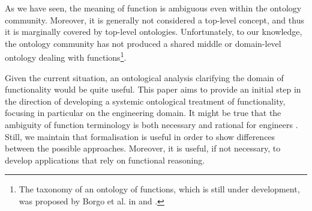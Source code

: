 \documentclass[sw]{iosart2x}
\newcommand{\TODO}[1]{{\color{red} #1
}}
\begin{document}


As we have seen, 
the meaning of function is ambiguous even within the ontology community. 
Moreover, it is generally not considered a top-level concept, and thus it is marginally covered by top-level ontologies. 
Unfortunately, to our knowledge, the ontology community has not produced a shared middle or domain-level ontology dealing with functions\footnote{The taxonomy of an ontology of functions, which is still under development, was proposed by Borgo et al. in \cite{borgoCapabilitiesCapacitiesFunctionalities2021} and \cite{borgoKnowledgebasedAdaptiveAgents2019}.}. 

Given the current situation, an ontological analysis clarifying the domain of functionality would be quite useful.
This paper aims to provide an initial step in the direction of developing a systemic ontological treatment of functionality, focusing in particular on the engineering domain.
It might be true that the ambiguity of function terminology is both necessary and rational for engineers \cite{vermaasConceptualElusivenessEngineering2012}. 
Still, we maintain that formalisation is useful in order to show differences between the possible approaches. Moreover, it is useful, if not necessary, to develop applications that rely on functional reasoning.
\end{document}
